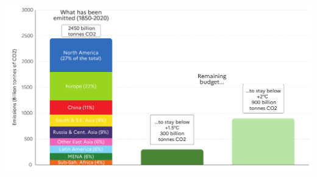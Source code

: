 \documentclass[9pt,handout,aspectratio=169]{beamer}
\begin{document}
\begin{frame}
\begin{scriptsize}
\begin{columns}
      \begin{center}
        \includegraphics[width=1.0\textwidth]{plots/WIR_budget_emitted_and_allowed}
      \end{center}      
    \end{columns}

  \end{scriptsize}
  \end{frame}  
\end{document}

